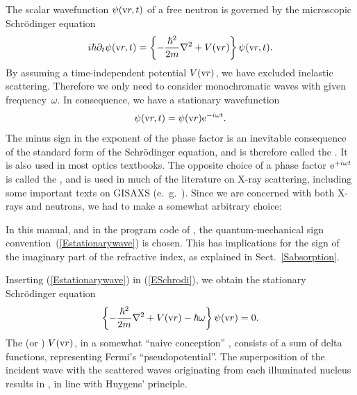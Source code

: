 %
The scalar wavefunction $\psi(\text{v}{r},t)$
%
%
%
of a free neutron
is governed by the microscopic Schrödinger equation
\begin{equation}\label{ESchrodi}
  i\hbar\partial_t \psi(\text{v}{r},t)
  = \left\{-\frac{\hbar^2}{2m}\mathbf{\nabla}^2+V(\text{v}{r})\right\} \psi(\text{v}{r},t).
\end{equation}
By assuming a time-independent potential $V(\text{v}{r})$,
we have excluded inelastic scattering.
Therefore we only need to consider monochromatic waves
with given frequency~$\omega$.
%
In consequence, we have a stationary wavefunction
\begin{equation}\label{Estationarywave}
  \psi(\text{v}{r},t) = \psi(\text{v}{r})\text{e}^{-i\omega t}.
\end{equation}
%
The minus sign in the exponent of the phase factor
is an inevitable consequence of the standard form of the Schrödinger equation,
and is therefore called the .
It is also used in most optics textbooks.
%
%
The opposite choice of a phase factor $\text{e}^{+i\omega t}$ is 
called the ,
and is used in much of the literature on X-ray scattering,
including some important texts on GISAXS (e.~g.\ \cite{ReLL09}).
Since we are concerned with both X-rays and neutrons,
we had to make a somewhat arbitrary choice:

\Note
{\indent In this manual, and in the program code of \BornAgain,
the quantum-mechanical sign convention~(\ref{Estationarywave}) is chosen.
This has implications for the sign of the imaginary part of the
refractive index,
%
as explained in Sect.~\ref{Sabsorption}.}

Inserting (\ref{Estationarywave}) in (\ref{ESchrodi}),
we obtain the stationary Schrödinger equation
\begin{equation}\label{EstatSchrodi}
  \left\{-\frac{\hbar^2}{2m}\mathbf{\nabla}^2+V(\text{v}{r})-\hbar\omega\right\} \psi(\text{v}{r}) = 0.
\end{equation}
%
%
%
%
The  (or )
 $V(\text{v}{r})$,
in a somewhat ``naive conception'' \cite[p.~7]{Sea89},
consists of a sum of delta functions,
representing Fermi's ``pseudopotential''.
%
The superposition of the incident wave with the scattered waves
originating from each illuminated nucleus
results in ,
%
in line with Huygens' principle.
%

